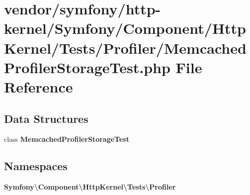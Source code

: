 \section{vendor/symfony/http-\/kernel/\+Symfony/\+Component/\+Http\+Kernel/\+Tests/\+Profiler/\+Memcached\+Profiler\+Storage\+Test.php File Reference}
\label{_memcached_profiler_storage_test_8php}
\subsection*{Data Structures}
\begin{DoxyCompactItemize}
\item 
class {\bf Memcached\+Profiler\+Storage\+Test}
\end{DoxyCompactItemize}
\subsection*{Namespaces}
\begin{DoxyCompactItemize}
\item 
 {\bf Symfony\textbackslash{}\+Component\textbackslash{}\+Http\+Kernel\textbackslash{}\+Tests\textbackslash{}\+Profiler}
\end{DoxyCompactItemize}
